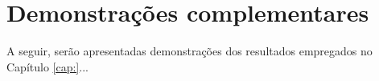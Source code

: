 \chapter{Demonstrações complementares}

A seguir, serão apresentadas demonstrações dos resultados empregados no Capítulo \ref{cap:}...